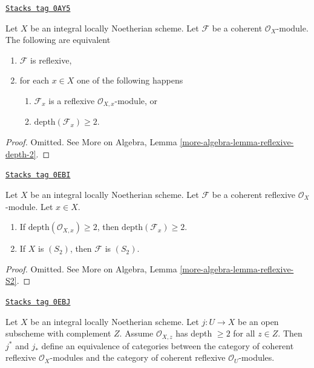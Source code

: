 \begin{lemma}
\label{divisors-lemma-reflexive-depth-2}
\href{https://stacks.math.columbia.edu/tag/0AY5}{\texttt{Stacks tag 0AY5}}

Let $X$ be an integral locally Noetherian scheme. Let $\mathcal{F}$
be a coherent $\mathcal{O}_X$-module. The following are equivalent
\begin{enumerate}
\item $\mathcal{F}$ is reflexive,
\item for each $x \in X$ one of the following happens
\begin{enumerate}
\item $\mathcal{F}_x$ is a reflexive $\mathcal{O}_{X, x}$-module, or
\item $\text{depth}(\mathcal{F}_x) \geq 2$.
\end{enumerate}
\end{enumerate}
\end{lemma}

\begin{proof}
Omitted. See More on Algebra, Lemma \ref{more-algebra-lemma-reflexive-depth-2}.
\end{proof}

\begin{lemma}[Reflexive S2]
\label{divisors-lemma-reflexive-S2}
\href{https://stacks.math.columbia.edu/tag/0EBI}{\texttt{Stacks tag 0EBI}}

Let $X$ be an integral locally Noetherian scheme.
Let $\mathcal{F}$ be a coherent reflexive $\mathcal{O}_X$-module.
Let $x \in X$.
\begin{enumerate}
\item If $\text{depth}(\mathcal{O}_{X, x}) \geq 2$, then
$\text{depth}(\mathcal{F}_x) \geq 2$.
\item If $X$ is $(S_2)$, then $\mathcal{F}$ is $(S_2)$.
\end{enumerate}
\end{lemma}

\begin{proof}
Omitted. See More on Algebra, Lemma \ref{more-algebra-lemma-reflexive-S2}.
\end{proof}

\begin{lemma}
\label{divisors-lemma-reflexive-S2-extend}
\href{https://stacks.math.columbia.edu/tag/0EBJ}{\texttt{Stacks tag 0EBJ}}

Let $X$ be an integral locally Noetherian scheme. Let $j : U \to X$
be an open subscheme with complement $Z$. Assume $\mathcal{O}_{X, z}$
has depth $\geq 2$ for all $z \in Z$. Then $j^*$ and $j_*$ define
an equivalence of categories between the category of coherent reflexive
$\mathcal{O}_X$-modules and the category of coherent reflexive
$\mathcal{O}_U$-modules.
\end{lemma}

